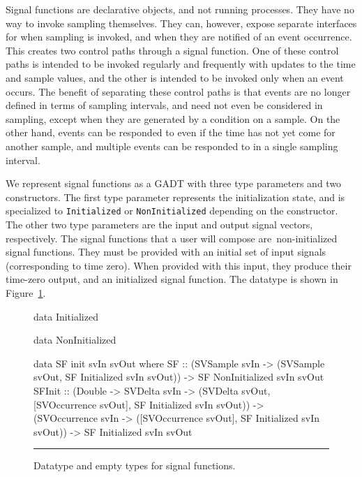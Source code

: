 Signal functions are declarative objects, and not running processes. They have
no way to invoke sampling themselves. They can, however, expose separate
interfaces for when sampling is invoked, and when they are notified of an event
occurrence. This creates two control paths through a signal function. One of
these control paths is intended to be invoked regularly and frequently with
updates to the time and sample values, and the other is intended to be invoked
only when an event occurs. The benefit of separating these control paths is that
events are no longer defined in terms of sampling intervals, and need not even
be considered in sampling, except when they are generated by a condition on a
sample. On the other hand, events can be responded to even if the time has not
yet come for another sample, and multiple events can be responded to in a single
sampling interval.

We represent signal functions as a GADT with three type parameters and two 
constructors. The first type parameter represents the initialization state,
and is specialized to {\tt Initialized} or {\tt NonInitialized} depending on the
constructor. The other two type parameters are the input and output signal
vectors, respectively. The signal functions that a user will compose are\
non-initialized signal functions. They must be provided with an initial set of
input signals (corresponding to time zero). When provided with this input, they
produce their time-zero output, and an initialized signal function. The datatype
is shown in Figure~\ref{figure:signal_function_datatype}.

\begin{figure}
\begin{code}
data Initialized

data NonInitialized

data SF init svIn svOut where
  SF     ::    (SVSample svIn 
                  -> (SVSample svOut,
                      SF Initialized svIn svOut)) 
            -> SF NonInitialized svIn svOut
  SFInit ::    (Double 
                  -> SVDelta svIn
                  -> (SVDelta svOut,
                      [SVOccurrence svOut],
                      SF Initialized svIn svOut)) 
            -> (SVOccurrence svIn
                  -> ([SVOccurrence svOut],
                      SF Initialized svIn svOut))
            -> SF Initialized svIn svOut
\end{code}
\hrule
\caption{Datatype and empty types for signal functions.}
\label{figure:signal_function_datatype}
\end{figure}

